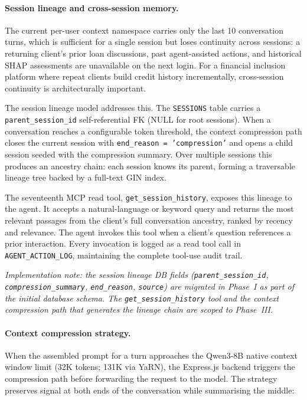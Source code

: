 \documentclass[12pt,a4paper]{report}
\begin{document}
\paragraph{Session lineage and cross-session memory.}

The current per-user context namespace carries only the last 10 conversation turns,
which is sufficient for a single session but loses continuity across sessions: a
returning client's prior loan discussions, past agent-assisted actions, and
historical SHAP assessments are unavailable on the next login. For a financial
inclusion platform where repeat clients build credit history incrementally,
cross-session continuity is architecturally important.

The session lineage model addresses this. The \texttt{SESSIONS} table carries a
\texttt{parent\_session\_id} self-referential FK (NULL for root sessions). When a
conversation reaches a configurable token threshold, the context compression path
closes the current session with \texttt{end\_reason = 'compression'} and opens a
child session seeded with the compression summary. Over multiple sessions this
produces an ancestry chain: each session knows its parent, forming a traversable
lineage tree backed by a full-text GIN index.

The seventeenth MCP read tool, \texttt{get\_session\_history}, exposes this lineage
to the agent. It accepts a natural-language or keyword query and returns the most
relevant passages from the client's full conversation ancestry, ranked by recency
and relevance. The agent invokes this tool when a client's question references a
prior interaction. Every invocation is logged as a read tool call in
\texttt{AGENT\_ACTION\_LOG}, maintaining the complete tool-use audit trail.

\textit{Implementation note: the session lineage DB fields
(\texttt{parent\_session\_id}, \texttt{compression\_summary}, \texttt{end\_reason},
\texttt{source}) are migrated in Phase~I as part of the initial database schema.
The \texttt{get\_session\_history} tool and the context compression path that
generates the lineage chain are scoped to Phase~III.}

\paragraph{Context compression strategy.}

When the assembled prompt for a turn approaches the Qwen3-8B native context window
limit (32K tokens; 131K via YaRN), the Express.js backend triggers the compression
path before forwarding the request to the model. The strategy preserves signal at
both ends of the conversation while summarising the middle:
\end{document}
